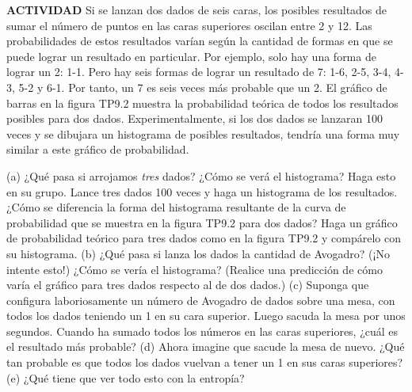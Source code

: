 \item \textbf{ACTIVIDAD} Si se lanzan dos dados de seis caras, los posibles resultados de sumar el número de puntos en las caras superiores oscilan entre 2 y 12. Las probabilidades de estos resultados varían según la cantidad de formas en que se puede lograr un resultado en particular. Por ejemplo, solo hay una forma de lograr un 2: 1-1. Pero hay seis formas de lograr un resultado de 7: 1-6, 2-5, 3-4, 4-3, 5-2 y 6-1. Por tanto, un 7 es seis veces más probable que un 2. El gráfico de barras en la figura TP9.2 muestra la probabilidad teórica de todos los resultados posibles para dos dados. Experimentalmente, si los dos dados se lanzaran 100 veces y se dibujara un histograma de posibles resultados, tendría una forma muy similar a este gráfico de probabilidad. 

(a) ¿Qué pasa si arrojamos \textit{tres} dados? ¿Cómo se verá el histograma? Haga esto en su grupo. Lance tres dados 100 veces y haga un histograma de los resultados. ¿Cómo se diferencia la forma del histograma resultante de la curva de probabilidad que se muestra en la figura TP9.2 para dos dados? Haga un gráfico de probabilidad teórico para tres dados como en la figura TP9.2 y compárelo con su histograma. 
(b) ¿Qué pasa si lanza los dados la cantidad de Avogadro? (¡No intente esto!) ¿Cómo se vería el histograma? (Realice una predicción de cómo varía el gráfico para tres dados respecto al de dos dados.) 
(c) Suponga que configura laboriosamente un número de Avogadro de dados sobre una mesa, con todos los dados teniendo un 1 en su cara superior. Luego sacuda la mesa por unos segundos. Cuando ha sumado todos los números en las caras superiores, ¿cuál es el resultado más probable? 
(d) Ahora imagine que sacude la mesa de nuevo. ¿Qué tan probable es que todos los dados vuelvan a tener un 1 en sus caras superiores? 
(e) ¿Qué tiene que ver todo esto con la entropía?
